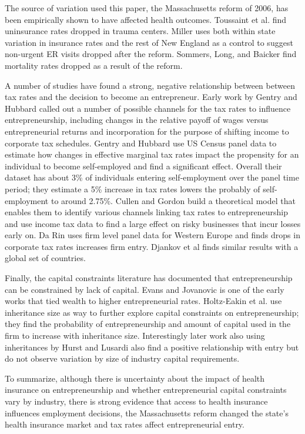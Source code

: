 \documentclass[12pt]{article}
\begin{document}
The source of variation used this paper, the Massachusetts reform of 2006, has been empirically shown to have affected health outcomes. Toussaint et al. \cite{toussaint} find uninsurance rates dropped in trauma centers. Miller \cite{miller_er} uses both within state variation in insurance rates and the rest of New England as a control to suggest non-urgent ER visits dropped after the reform.  Sommers, Long, and Baicker \cite{sommers} find mortality rates dropped as a result of the reform. 

A number of studies have found a strong, negative relationship between between tax rates and the decision to become an entrepreneur. Early work by Gentry and Hubbard \cite{gentry} called out a number of possible channels for the tax rates to influence entrepreneurship, including changes in the relative payoff of wages versus entrepreneurial returns and incorporation for the purpose of shifting income to corporate tax schedules. Gentry and Hubbard use US Census panel data to estimate how changes in effective marginal tax rates impact the propensity for an individual to become self-employed and find a significant effect. Overall their dataset has about 3\% of individuals entering self-employment over the panel time period; they estimate a 5\% increase in tax rates lowers the probably of self-employment to around 2.75\%. Cullen and Gordon \cite{cullen} build a theoretical model that enables them to identify various channels linking tax rates to entrepreneurship and use income tax data to find a large effect on risky businesses that incur losses early on. Da Rin \cite{darin} uses firm level panel data for Western Europe and finds drops in corporate tax rates increases firm entry. Djankov et al \cite{djankov} finds similar results with a global set of countries. 

Finally, the capital constraints literature has documented that entrepreneurship can be constrained by lack of capital. Evans and Jovanovic \cite{evans} is one of the early works that tied wealth to higher entrepreneurial rates. Holtz-Eakin et al. use inheritance size as way to further explore capital constraints on entrepreneurship; they find the probability of entrepreneurship and amount of capital used in the firm to increase with inheritance size. Interestingly later work also using inheritances by Hurst and Lusardi \cite{hurst} also find a positive relationship with entry but do not observe variation by size of industry capital requirements. 

To summarize, although there is uncertainty about the impact of health insurance on entrepreneurship and whether entrepreneurial capital constraints vary by industry, there is strong evidence that access to health insurance influences employment decisions, the Massachusetts reform changed the state's health insurance market and tax rates affect entrepreneurial entry.
\end{document}
